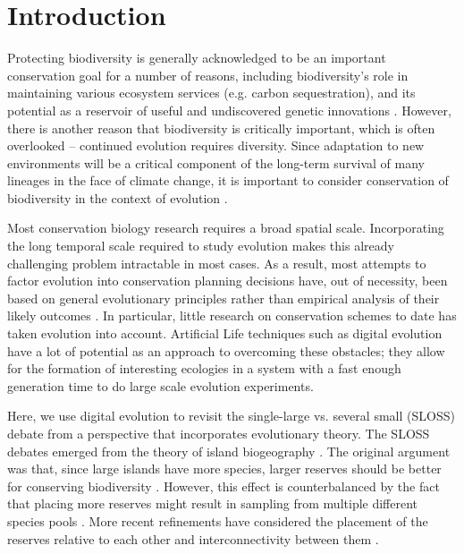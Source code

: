 \documentclass[letterpaper]{article}
\begin{document}
\section{Introduction}

Protecting biodiversity is generally acknowledged to be an important conservation goal for a number of reasons, including biodiversity's role in maintaining various ecosystem services (e.g. carbon sequestration), and its potential as a reservoir of useful and undiscovered genetic innovations \citep{gaston_biodiversity:_2004,hassan_ecosystems_2005,loreau_biodiversity_2001,montoya_emerging_2012}. However, there is another reason that biodiversity is critically important, which is often overlooked -- continued evolution requires diversity. Since adaptation to new environments will be a critical component of the long-term survival of many lineages in the face of climate change, it is important to consider conservation of biodiversity in the context of evolution \citep{stockwell_contemporary_2003, mace_evolutionary_2008,smith_prescriptive_2014}. 

	Most conservation biology research requires a broad spatial scale. Incorporating the long temporal scale required to study evolution makes this already challenging problem intractable in most cases. As a result, most attempts to factor evolution into conservation planning decisions have, out of necessity, been based on general evolutionary principles rather than empirical analysis of their likely outcomes  \citep{cowling_rapid_2001, sgro_building_2011, ferriere_evolutionary_2004}. In particular, little research on conservation schemes to date has taken evolution into account. Artificial Life techniques such as digital evolution have a lot of potential as an approach to overcoming these obstacles; they allow for the formation of interesting ecologies in a system with a fast enough generation time to do large scale evolution experiments.
    
    Here, we use digital evolution to revisit the single-large vs. several small (SLOSS) debate from a perspective that incorporates evolutionary theory. The SLOSS debates emerged from the theory of island biogeography \citep{macarthur_theory_1967}. The original argument was that, since large islands have more species, larger reserves should be better for conserving biodiversity \citep{diamond_island_1975}. However, this effect is counterbalanced by the fact that placing more reserves might result in sampling from multiple different species pools \citep{simberloff_island_1976}. More recent refinements have considered the placement of the reserves relative to each other and interconnectivity between them \citep{saunders_biological_1991,tjorve_how_2010}. 
\end{document}
